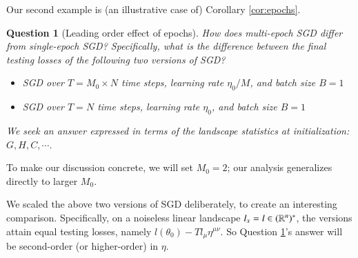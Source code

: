\documentclass[anon,12pt]{colt2021} %
\newtheorem{quest}{Question}
\begin{document}
                Our second example is (an illustrative case of)
                Corollary \ref{cor:epochs}.
                \begin{quest}[Leading order effect of epochs]\label{qst:multi}
                    How does multi-epoch SGD differ from single-epoch SGD?
                    Specifically, what is the difference between the final
                    testing losses of the following two versions of SGD?
                    \begin{itemize}
                        \item SGD over $T=M_0 \times N$ time steps, learning rate $\eta_0/M$, and
                            batch size $B=1$
                        \item SGD over $T=N$ time steps, learning rate $\eta_0$, and batch size $B=1$
                    \end{itemize}
                    We seek an answer expressed in terms of the landscape statistics
                    at initialization: $G,H,C, \cdots$.
                \end{quest}
                To make our discussion concrete, we will set $M_0=2$; our analysis 
                generalizes directly to larger $M_0$.

                We scaled the above two versions of SGD deliberately, to create an
                interesting comparison.  Specifically, on a noiseless linear
                landscape $l_x=l \in (\mathbb{R}^n)^*$, the versions attain equal testing
                losses, namely $l(\theta_0) - T l_\mu \eta^{\mu\nu}$.
                So Question \ref{qst:multi}'s answer will be second-order (or
                higher-order) in $\eta$.
\end{document}
